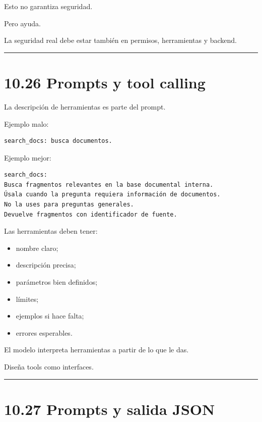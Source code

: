 Esto no garantiza seguridad.

Pero ayuda.

La seguridad real debe estar también en permisos, herramientas y
backend.

\begin{center}\rule{0.5\linewidth}{0.5pt}\end{center}

\section{10.26 Prompts y tool calling}\label{prompts-y-tool-calling}

La descripción de herramientas es parte del prompt.

Ejemplo malo:

\begin{lstlisting}
search_docs: busca documentos.
\end{lstlisting}

Ejemplo mejor:

\begin{lstlisting}
search_docs:
Busca fragmentos relevantes en la base documental interna.
Úsala cuando la pregunta requiera información de documentos.
No la uses para preguntas generales.
Devuelve fragmentos con identificador de fuente.
\end{lstlisting}

Las herramientas deben tener:

\begin{itemize}
\tightlist
\item
  nombre claro;
\item
  descripción precisa;
\item
  parámetros bien definidos;
\item
  límites;
\item
  ejemplos si hace falta;
\item
  errores esperables.
\end{itemize}

El modelo interpreta herramientas a partir de lo que le das.

Diseña tools como interfaces.

\begin{center}\rule{0.5\linewidth}{0.5pt}\end{center}

\section{10.27 Prompts y salida JSON}\label{prompts-y-salida-json}

